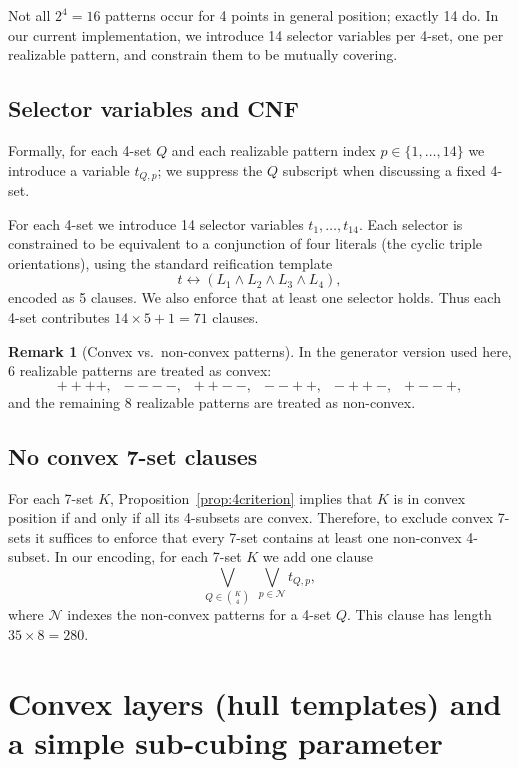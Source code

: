 \documentclass[11pt,a4paper]{article}
\theoremstyle{definition}
\newtheorem{remark}{Remark}
\begin{document}
Not all $2^4=16$ patterns occur for 4 points in general position; exactly 14 do. In our current implementation, we introduce 14 selector variables per 4-set, one per realizable pattern, and constrain them to be mutually covering.

\subsection{Selector variables and CNF}

Formally, for each 4-set $Q$ and each realizable pattern index $p\in\{1,\dots,14\}$ we introduce a variable $t_{Q,p}$; we suppress the $Q$ subscript when discussing a fixed 4-set.

For each 4-set we introduce 14 selector variables $t_1,\dots,t_{14}$. Each selector is constrained to be equivalent to a conjunction of four literals (the cyclic triple orientations), using the standard reification template
\[
t \leftrightarrow (L_1\wedge L_2\wedge L_3\wedge L_4),
\]
encoded as 5 clauses. We also enforce that at least one selector holds. Thus each 4-set contributes $14\times 5+1 = 71$ clauses.

\begin{remark}[Convex vs.\ non-convex patterns]
In the generator version used here, 6 realizable patterns are treated as convex:
\[
++++,\;\; ----,\;\; ++--,\;\; --++,\;\; -++-,\;\; +--+,
\]
and the remaining 8 realizable patterns are treated as non-convex.
\end{remark}

\subsection{No convex 7-set clauses}

For each 7-set $K$, Proposition~\ref{prop:4criterion} implies that $K$ is in convex position if and only if all its 4-subsets are convex. Therefore, to exclude convex 7-sets it suffices to enforce that every 7-set contains at least one non-convex 4-subset. In our encoding, for each 7-set $K$ we add one clause
\[
\bigvee_{Q\in \binom{K}{4}}\;\bigvee_{p\in \mathcal{N}} t_{Q,p},
\]
where $\mathcal{N}$ indexes the non-convex patterns for a 4-set $Q$. This clause has length $35\times 8=280$.

\section{Convex layers (hull templates) and a simple sub-cubing parameter}
\end{document}
